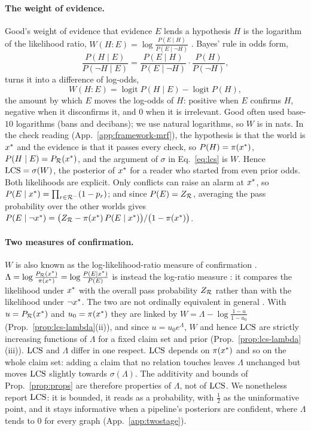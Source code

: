 

\paragraph{The weight of evidence.}
\label{app:woe}
Good's weight of evidence that evidence $E$ lends a hypothesis $H$ is the logarithm of the
likelihood ratio, $W(H:E)=\log\frac{P(E\mid H)}{P(E\mid\neg H)}$ \citep{good1950}. Bayes' rule in
odds form,
\begin{equation*}
\frac{P(H\mid E)}{P(\neg H\mid E)}=\frac{P(E\mid H)}{P(E\mid\neg H)}\cdot\frac{P(H)}{P(\neg H)},
\end{equation*}
turns it into a difference of log-odds,
\begin{equation*}
W(H:E)=\operatorname{logit}P(H\mid E)-\operatorname{logit}P(H),
\end{equation*}
the amount by which $E$ moves the log-odds of $H$: positive when $E$ confirms $H$, negative when
it disconfirms it, and $0$ when it is irrelevant. Good often used base-$10$ logarithms (bans and
decibans); we use natural logarithms, so $W$ is in nats. In the check reading
(App.~\ref{app:framework-mrf}), the hypothesis is that the world is $x^{\ast}$ and the evidence is that
it passes every check, so $P(H)=\pi(x^{\ast})$, $P(H\mid E)=P_{\mathcal{R}}(x^{\ast})$, and the argument of $\sigma$ in
Eq.~\ref{eq:lcs} is $W$. Hence $\mathrm{LCS}=\sigma(W)$, the posterior of $x^{\ast}$ for a reader who started
from even prior odds. Both likelihoods are explicit. Only conflicts can raise an alarm at $x^{\ast}$, so
$P(E\mid x^{\ast})=\prod_{r\in\mathcal{R}^{-}}(1-p_r)$; and since $P(E)=Z_{\mathcal{R}}$, averaging the pass probability over
the other worlds gives
$P(E\mid\neg x^{\ast})=\bigl(Z_{\mathcal{R}}-\pi(x^{\ast})\,P(E\mid x^{\ast})\bigr)/\bigl(1-\pi(x^{\ast})\bigr)$.

\paragraph{Two measures of confirmation.} $W$ is also known as the log-likelihood-ratio measure of
confirmation \citep{fitelson1999}. $\Lambda=\log\frac{P_{\mathcal{R}}(x^{\ast})}{\pi(x^{\ast})}=\log\frac{P(E\mid x^{\ast})}{P(E)}$
is instead the log-ratio measure \citep{milne1996}: it compares the likelihood under $x^{\ast}$ with the
overall pass probability $Z_{\mathcal{R}}$ rather than with the likelihood under $\neg x^{\ast}$. The two are not
ordinally equivalent in general \citep{fitelson1999}. With $u=P_{\mathcal{R}}(x^{\ast})$ and $u_0=\pi(x^{\ast})$ they are
linked by $W=\Lambda-\log\frac{1-u}{1-u_0}$ (Prop.~\ref{prop:lcs-lambda}(ii)), and since
$u=u_0e^{\Lambda}$, $W$ and hence $\mathrm{LCS}$ are strictly increasing functions of $\Lambda$ for a fixed
claim set and prior (Prop.~\ref{prop:lcs-lambda}(iii)). $\mathrm{LCS}$ and $\Lambda$ differ in one
respect. $\mathrm{LCS}$ depends on $\pi(x^{\ast})$ and so on the whole claim set: adding a
claim that no relation touches leaves $\Lambda$ unchanged but moves $\mathrm{LCS}$ slightly towards
$\sigma(\Lambda)$. The additivity and bounds of Prop.~\ref{prop:props} are therefore properties of
$\Lambda$, not of $\mathrm{LCS}$. We nonetheless report $\mathrm{LCS}$: it is bounded, it reads as a probability,
with $\frac12$ as the uninformative point, and it stays informative when a pipeline's posteriors
are confident, where $\Lambda$ tends to $0$ for every graph (App.~\ref{app:twostage}).

